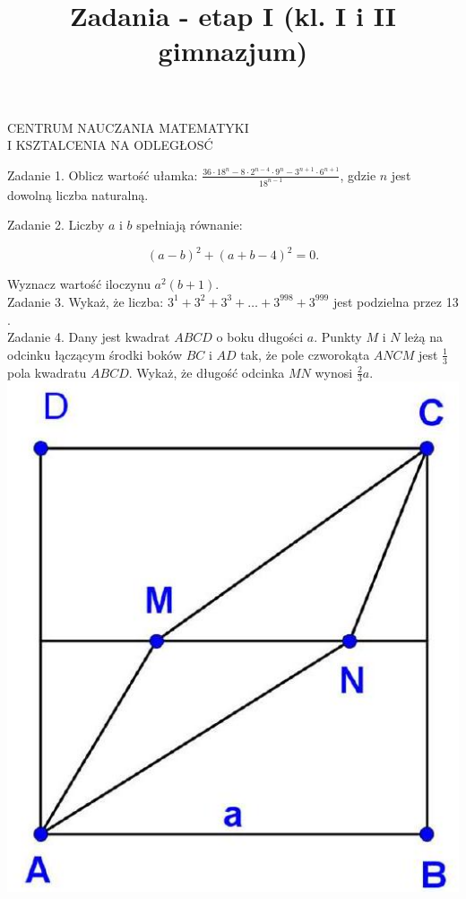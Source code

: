 \documentclass[10pt]{article}
\title{Zadania - etap I (kl. I i II gimnazjum) }
\author{}
\date{}
\begin{document}
\maketitle
CENTRUM NAUCZANIA MATEMATYKI\\
I KSZTALCENIA NA ODLEGŁOSĆ

Zadanie 1. Oblicz wartość ułamka: \(\frac{36 \cdot 18^{n}-8 \cdot 2^{n-4} \cdot 9^{n}-3^{n+1} \cdot 6^{n+1}}{18^{n-1}}\), gdzie \(n\) jest dowolną liczba naturalną.

Zadanie 2. Liczby \(a\) i \(b\) spełniają równanie:

\[
(a-b)^{2}+(a+b-4)^{2}=0 .
\]

Wyznacz wartość iloczynu \(a^{2}(b+1)\).\\
Zadanie 3. Wykaż, że liczba: \(3^{1}+3^{2}+3^{3}+\ldots+3^{998}+3^{999}\) jest podzielna przez 13 .\\
Zadanie 4. Dany jest kwadrat \(A B C D\) o boku długości \(a\). Punkty \(M\) i \(N\) leżą na odcinku łączącym środki boków \(B C\) i \(A D\) tak, że pole czworokąta \(A N C M\) jest \(\frac{1}{3}\) pola kwadratu \(A B C D\). Wykaż, że długość odcinka \(M N\) wynosi \(\frac{2}{3} a\).\\
\includegraphics[max width=\textwidth, center]{2024_11_21_e97811247d06ebb2c513g-1}
\end{document}
